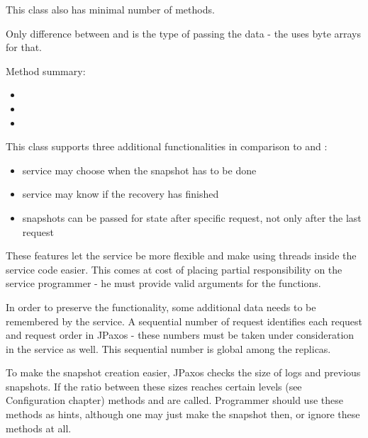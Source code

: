 \label{api:simplifiedservice-class}
This class also has minimal number of methods.

Only difference between  and  is the type of passing the data - the  uses byte arrays for that.

Method summary:
\begin{itemize}
\item {} 

\item {} 

\item {} 

\end{itemize}


\label{api:abstractservice-class}
This class supports three additional functionalities in comparison to  and :
\begin{itemize}
\item {} 
service may choose when the snapshot has to be done

\item {} 
service may know if the recovery has finished

\item {} 
snapshots can be passed for state after specific request, not only after the last request

\end{itemize}

These features let the service be more flexible and make using threads inside the service code easier. This comes at cost of placing partial responsibility on the service programmer - he must provide valid arguments for the functions.

In order to preserve the functionality, some additional data needs to be remembered by the service.
A sequential number of request identifies each request and request order in JPaxos - these numbers must be taken under consideration in the service as well. This sequential number is global among the replicas.

To make the snapshot creation easier, JPaxos checks the size of logs and previous snapshots. If the ratio between these sizes reaches certain levels (see Configuration chapter) methods  and  are called. Programmer should use these methods as hints, although one may just make the snapshot then, or ignore these methods at all.

